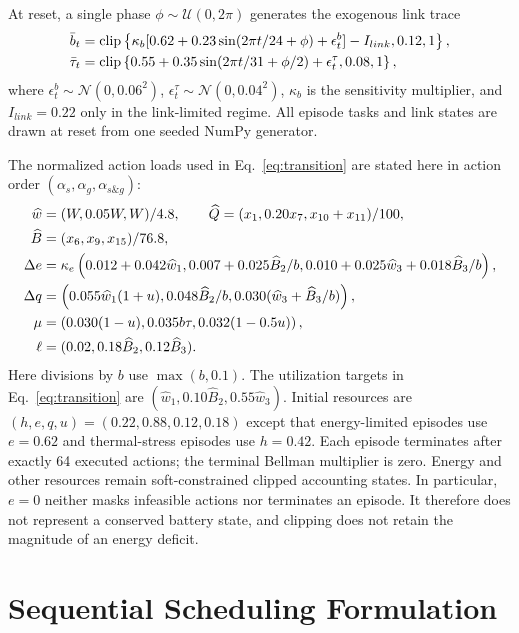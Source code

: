\documentclass[11pt]{article}
\DeclareMathOperator{\clip}{clip}
\begin{document}
At reset, a single phase $\phi\sim\mathcal U(0,2\pi)$ generates the exogenous link trace
\begin{align}
\bar b_t&=\clip\left\{\kappa_b[0.62+0.23\sin(2\pi t/24+\phi)+\epsilon^b_t]-I_{link},0.12,1\right\},\notag\\
\bar\tau_t&=\clip\left\{0.55+0.35\sin(2\pi t/31+\phi/2)+\epsilon^\tau_t,0.08,1\right\},
\label{eq:link_trace}
\end{align}
where $\epsilon^b_t\sim\mathcal N(0,0.06^2)$, $\epsilon^\tau_t\sim\mathcal N(0,0.04^2)$, $\kappa_b$ is the sensitivity multiplier, and $I_{link}=0.22$ only in the link-limited regime. All episode tasks and link states are drawn at reset from one seeded NumPy generator.

The normalized action loads used in Eq.~\eqref{eq:transition} are stated here in action order $(\alpha_s,\alpha_g,\alpha_{s\&g})$:
\begin{align}
\widehat w&=(W,0.05W,W)/4.8,\qquad
\widehat Q=(x_1,0.20x_7,x_{10}+x_{11})/100,\notag\\
\widehat B&=(x_6,x_9,x_{15})/76.8,\notag\\
\Delta e&=\kappa_e\left(0.012+0.042\widehat w_1,
0.007+0.025\widehat B_2/b,
0.010+0.025\widehat w_3+0.018\widehat B_3/b\right),\notag\\
\Delta q&=\left(0.055\widehat w_1(1+u),
0.048\widehat B_2/b,
0.030(\widehat w_3+\widehat B_3/b)\right),\notag\\
\mu&=\left(0.030(1-u),0.035b\tau,0.032(1-0.5u)\right),\notag\\
\ell&=(0.02,0.18\widehat B_2,0.12\widehat B_3).
\label{eq:action_loads}
\end{align}
Here divisions by $b$ use $\max(b,0.1)$. The utilization targets in Eq.~\eqref{eq:transition} are $(\widehat w_1,0.10\widehat B_2,0.55\widehat w_3)$. Initial resources are $(h,e,q,u)=(0.22,0.88,0.12,0.18)$ except that energy-limited episodes use $e=0.62$ and thermal-stress episodes use $h=0.42$. Each episode terminates after exactly 64 executed actions; the terminal Bellman multiplier is zero. Energy and other resources remain soft-constrained clipped accounting states. In particular, $e=0$ neither masks infeasible actions nor terminates an episode. It therefore does not represent a conserved battery state, and clipping does not retain the magnitude of an energy deficit.

\section{Sequential Scheduling Formulation}
\label{sec:mdp}
\end{document}
